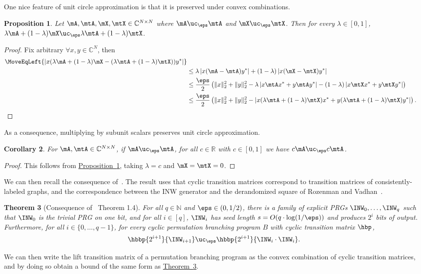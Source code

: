 \documentclass[11pt]{article}
\newcommand{\expref}[2]{\texorpdfstring{\hyperref[#2]{#1~\ref{#2}}}{#1~\ref{#2}}}
\newtheorem{theorem}{Theorem}[section]
\newtheorem{corollary}[theorem]{Corollary}
\newtheorem{proposition}[theorem]{Proposition}
\newcommand{\R}{{\mathbb R}}
\newcommand{\N}{{\mathbb N}}
\newcommand{\C}{{\mathbb C}}
\begin{document}
One nice feature of unit circle approximation is that it is preserved under convex combinations. %
\begin{proposition}\label{prop:UCavg}
    Let $\mA,\mtA ,\mX,\mtX\in \C^{N\times N}$ where $\mA\uc_\eps \mtA$ and $\mX \uc_\eps \mtX$. Then for every $\lambda\in [0,1]$, $\lambda \mA+(1-\lambda)\mX  \uc_\eps \lambda \mtA+(1-\lambda)\mtX$. %
\end{proposition}
\begin{proof}
    Fix arbitrary $\forall x,y \in \C^N$, then
    \begin{align*}
        \MoveEqLeft{\left| x(\lambda \mA+(1-\lambda)\mX -(\lambda \mtA+(1-\lambda)\mtX))y^* \right|}\\
        &\leq \lambda\left|x(\mA-\mtA)y^*\right|+(1-\lambda)\left|x(\mX -\mtX)y^*\right|\\
        &\leq \frac{\eps}{2}\left(\|x\|_2^2+\|y\|_2^2 - \lambda \left|x\mtA x^*+y\mtA y^*\right|-(1-\lambda)\left|x\mtX x^*+y\mtX y^*\right|\right)\\
        &\leq \frac{\eps}{2}\left(\|x\|_2^2+\|y\|_2^2 - \left|x(\lambda \mtA +(1-\lambda)\mtX )x^*+y(\lambda \mtA +(1-\lambda)\mtX )y^*\right|\right). \qedhere
    \end{align*}
\end{proof}
As a consequence, multiplying by subunit scalars preserves unit circle approximation.
\begin{corollary}\label{cor:UCscale}
    For $\mA,\mtA \in \C^{N\times N}$, if $\mA\uc_\eps \mtA$, for all $c \in \R$ with $c\in[0,1]$ we have $c\mA\uc_\eps c\mtA$.
\end{corollary}
\begin{proof}
    This follows from \expref{Proposition}{prop:UCavg}, taking $\lambda=c$ and $\mX=\mtX=0$.
\end{proof}
    
    We can then recall the consequence of~\cite{HozaPyVa21}. The result uses that cyclic transition matrices correspond to transition matrices of consistently-labeled graphs, and the correspondence between the INW generator and the derandomized square of Rozenman and Vadhan~\cite{RozenmanVa05}.
\begin{theorem}[Consequence of~\cite{HozaPyVa21} Theorem 1.4]\label{thm:HozaPyVa21gen}
    For all $q \in \N$ and $\eps \in (0,1/2)$, there is a family of explicit PRGs $\INW_0,\ldots,\INW_q$ such that $\INW_0$ is the trivial PRG on one bit, and for all $i\in [q]$, $\INW_i$ has seed length $s=O(q\cdot\log(1/\eps))$ and produces $2^i$ bits of output. Furthermore, for all $i \in \{0,\ldots,q-1\}$, for every cyclic permutation branching program $B$ with cyclic transition matrix $\hbp$,
    \[\hbbp{2^{i+1}}{\INW_{i+1}}\uc_{\eps} \hbbp{2^{i+1}}{\INW_i\cdot\INW_i}.\]
\end{theorem}
We can then write the lift transition matrix of a permutation branching program as the convex combination of cyclic transition matrices, and by doing so obtain a bound of the same form as \expref{Theorem}{thm:HozaPyVa21gen}.
\end{document}
